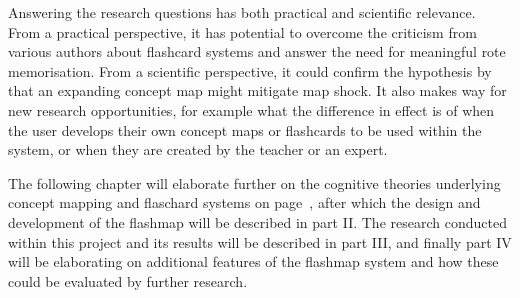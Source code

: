 Answering the research questions has both practical and scientific relevance. From a practical perspective, it has potential to overcome the criticism from various authors about flashcard systems and answer the need for meaningful rote memorisation. From a scientific perspective, it could confirm the hypothesis by  that an expanding concept map might mitigate map shock. It also makes way for new research opportunities, for example what the difference in effect is of when the user develops their own concept maps or flashcards to be used within the system, or when they are created by the teacher or an expert. 

The following chapter will elaborate further on the cognitive theories underlying concept mapping and flaschard systems on page~\pageref{ch:theory}, after which the design and development of the flashmap will be described in part II. The research conducted within this project and its results will be described in part III, and finally part IV will be elaborating on additional features of the flashmap system and how these could be evaluated by further research.
